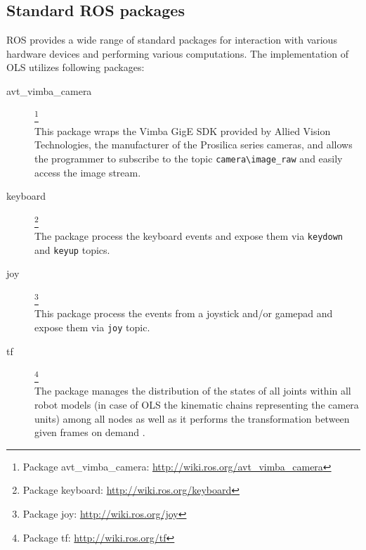 
\subsection{Standard ROS packages}

ROS provides a wide range of standard packages for interaction with various hardware devices and performing various computations. The implementation of OLS utilizes following packages:

\begin{description}
	\item[avt\_vimba\_camera]\footnote{Package avt\_vimba\_camera: \url{http://wiki.ros.org/avt_vimba_camera}} \hfill \\
	This package wraps the Vimba GigE SDK provided by Allied Vision Technologies, the manufacturer of the Prosilica series cameras, and allows the programmer to subscribe to the topic \texttt{camera\textbackslash image\_raw} and easily access the image stream.
	
	\item[keyboard]\footnote{Package keyboard: \url{http://wiki.ros.org/keyboard}} \hfill \\
	The package process the keyboard events and expose them via \texttt{keydown} and \texttt{keyup} topics.
	
	\item[joy]\footnote{Package joy: \url{http://wiki.ros.org/joy}} \hfill \\
	This package process the events from a joystick and/or gamepad and expose them via \texttt{joy} topic.
	
	\item[tf]\footnote{Package tf: \url{http://wiki.ros.org/tf}} \hfill \\
	The package manages the distribution of the states of all joints within all robot models (in case of OLS the kinematic chains representing the camera units) among all nodes as well as it performs the transformation between given frames on demand \cite{tf}.
	
\end{description}
	

